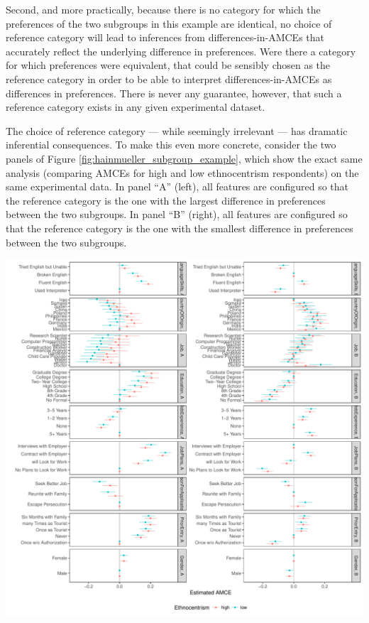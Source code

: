 \documentclass[a4paper,12pt]{article}\usepackage[]{graphicx}\usepackage[]{color}
\makeatletter
\def\maxwidth{ %
  \ifdim\Gin@nat@width>\linewidth
    \linewidth
  \else
    \Gin@nat@width
  \fi
}
\newenvironment{kframe}{%
 \def\at@end@of@kframe{}%
 \ifinner\ifhmode%
  \def\at@end@of@kframe{\end{minipage}}%
  \begin{minipage}{\columnwidth}%
 \fi\fi%
 \def\FrameCommand##1{\hskip\@totalleftmargin \hskip-\fboxsep
 \colorbox{shadecolor}{##1}\hskip-\fboxsep
     \hskip-\linewidth \hskip-\@totalleftmargin \hskip\columnwidth}%
 \MakeFramed {\advance\hsize-\width
   \@totalleftmargin\z@ \linewidth\hsize
   \@setminipage}}%
 {\par\unskip\endMakeFramed%
 \at@end@of@kframe}
\newenvironment{knitrout}{}{} %
\makeatother
\begin{document}
Second, and more practically, because there is no category for which the preferences of the two subgroups in this example are identical, no choice of reference category will lead to inferences from differences-in-AMCEs that accurately reflect the underlying difference in preferences. Were there a category for which preferences were equivalent, that could be sensibly chosen as the reference category in order to be able to interpret differences-in-AMCEs as differences in preferences. There is never any guarantee, however, that such a reference category exists in any given experimental dataset.

The choice of reference category --- while seemingly irrelevant --- has dramatic inferential consequences. To make this even more concrete, consider the two panels of Figure \ref{fig:hainmueller_subgroup_example}, which show the exact same analysis (comparing AMCEs for high and low ethnocentrism respondents) on the same experimental data. In panel ``A'' (left), all features are configured so that the reference category is the one with the largest difference in preferences between the two subgroups. In panel ``B'' (right), all features are configured so that the reference category is the one with the smallest difference in preferences between the two subgroups.



\begin{knitrout}
\color{fgcolor}\begin{kframe}


{\ttfamily\noindent\itshape\color{messagecolor}{\#\# Loading required namespace: ggstance}}\end{kframe}
\includegraphics[width=\maxwidth]{figure/hainmueller_subgroup_example_plot-1} 

\end{knitrout}
\end{document}
